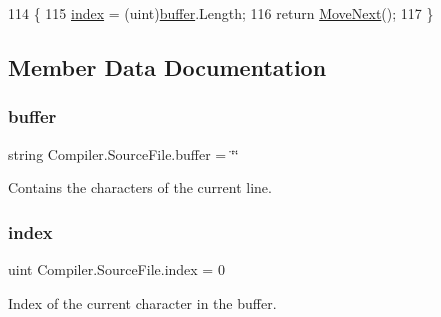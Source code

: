 \begin{DoxyCode}
114                                                  \{
115                         \mbox{\hyperlink{class_compiler_1_1_source_file_a46a2996b918f0b2f795449879663cfe5}{index}} = (uint)\mbox{\hyperlink{class_compiler_1_1_source_file_a6ac27509abd78029bf3881636983ab48}{buffer}}.Length;
116                         \textcolor{keywordflow}{return} \mbox{\hyperlink{class_compiler_1_1_source_file_ad80d0f3a9ead18dce6baad58971838bb}{MoveNext}}();
117                     \}
\end{DoxyCode}


\subsection{Member Data Documentation}
\mbox{\label{class_compiler_1_1_source_file_a6ac27509abd78029bf3881636983ab48}} 
\subsubsection{\texorpdfstring{buffer}{buffer}}
{\footnotesize\ttfamily string Compiler.\+Source\+File.\+buffer = \char`\"{}\char`\"{}\hspace{0.3cm}{\ttfamily [private]}}

Contains the characters of the current line. \mbox{\label{class_compiler_1_1_source_file_a46a2996b918f0b2f795449879663cfe5}} 
\subsubsection{\texorpdfstring{index}{index}}
{\footnotesize\ttfamily uint Compiler.\+Source\+File.\+index = 0\hspace{0.3cm}{\ttfamily [private]}}

Index of the current character in the buffer. \mbox{\label{class_compiler_1_1_source_file_a9fea4fc4a3640f2f88db7d2e8be3db70}} 
